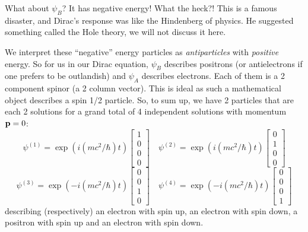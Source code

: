 What about $\psi_B$? It has negative energy! What the heck?! This is a famous
disaster, and Dirac's response was like the Hindenberg of physics. He suggested
something called the Hole theory, we will not discuss it here. 

We interpret these ``negative'' energy particles as \emph{antiparticles} with
\emph{positive} energy. So for us in our Dirac equation, $\psi_B$ describes
positrons (or antielectrons if one prefers to be outlandish) and $\psi_A$ 
describes electrons. Each of them is a 2 component spinor (a 2 column vector).
This is ideal as such a mathematical object describes a spin 1/2 particle. So,
to sum up, we have 2 particles that are each 2 solutions for a grand total of
4 independent solutions with momentum $\bold{p}=0$:
\begin{equation}
\psi^{(1)} = \exp(i(mc^2/\hbar)t)\begin{bmatrix}
1\\
0\\
0\\
0
\end{bmatrix}\quad\psi^{(2)} = \exp(i(mc^2/\hbar)t)\begin{bmatrix}
0\\
1\\
0\\
0
\end{bmatrix}
\end{equation}
\begin{equation}
\psi^{(3)} = \exp(-i(mc^2/\hbar)t)\begin{bmatrix}
0\\
0\\
1\\
0
\end{bmatrix}\quad\psi^{(4)} = \exp(-i(mc^2/\hbar)t)\begin{bmatrix}
0\\
0\\
0\\
1
\end{bmatrix}
\end{equation}
describing (respectively) an electron with spin up, an electron with spin
down, a positron with spin up and an electron with spin down.

